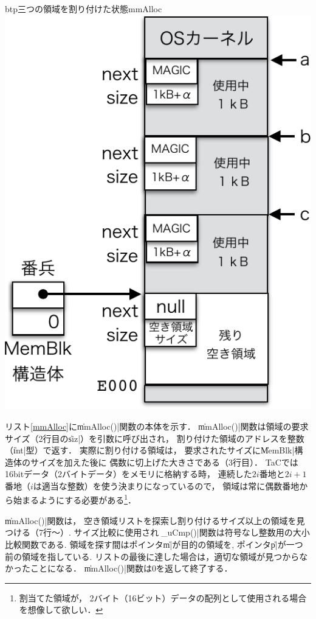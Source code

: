 \begin{myfig}{btp}{三つの領域を割り付けた状態}{mmAlloc}
  \includegraphics[scale=0.66]{Fig/mmAlloc-crop.pdf}
\end{myfig}

リスト\ref{mmAlloc}に\|mmAlloc()|関数の本体を示す．
\|mmAlloc()|関数は領域の要求サイズ（2行目の\|siz|）を引数に呼び出され，
割り付けた領域のアドレスを整数（\|int|型）で返す．
実際に割り付ける領域は，
要求されたサイズに\|MemBlk|構造体のサイズを加えた後に
偶数に切上げた大きさである（3行目）．
TaCでは16bitデータ（2バイトデータ）をメモリに格納する時，
連続した$2i$番地と$2i+1$番地（$i$は適当な整数）を使う決まりになっているので，
領域は常に偶数番地から始まるようにする必要がある\footnote{
  割当てた領域が，
  2バイト（16ビット）データの配列として使用される場合を想像して欲しい．}．



\|mmAlloc()|関数は，
空き領域リストを探索し割り付けるサイズ以上の領域を見つける（7行〜）.
サイズ比較に使用される\|_uCmp()|関数は符号なし整数用の大小比較関数である.
領域を探す間はポインタ\|m|が目的の領域を,
ポインタ\|p|が一つ前の領域を指している.
リストの最後に達した場合は，適切な領域が見つからなかったことになる．
\|mmAlloc()|関数は0を返して終了する．

